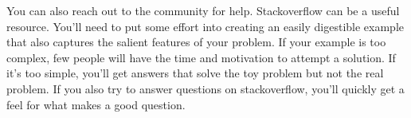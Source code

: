 You can also reach out to the community for help. Stackoverflow can be a
useful resource. You'll need to put some effort into creating an easily
digestible example that also captures the salient features of your
problem. If your example is too complex, few people will have the time
and motivation to attempt a solution. If it's too simple, you'll get
answers that solve the toy problem but not the real problem. If you also
try to answer questions on stackoverflow, you'll quickly get a feel for
what makes a good question.
